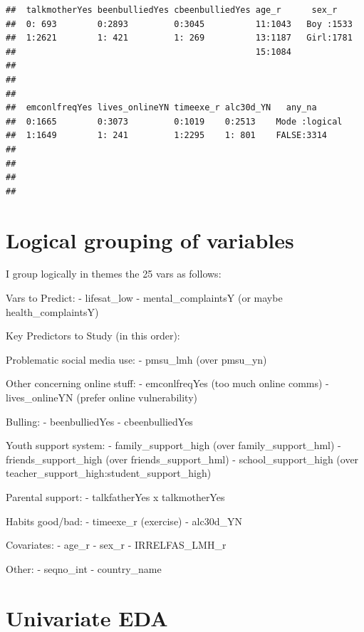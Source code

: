 \documentclass[
]{article}
\begin{document}
\begin{verbatim}
##  talkmotherYes beenbulliedYes cbeenbulliedYes age_r      sex_r     
##  0: 693        0:2893         0:3045          11:1043   Boy :1533  
##  1:2621        1: 421         1: 269          13:1187   Girl:1781  
##                                               15:1084              
##                                                                    
##                                                                    
##                                                                    
##  emconlfreqYes lives_onlineYN timeexe_r alc30d_YN   any_na       
##  0:1665        0:3073         0:1019    0:2513    Mode :logical  
##  1:1649        1: 241         1:2295    1: 801    FALSE:3314     
##                                                                  
##                                                                  
##                                                                  
## 
\end{verbatim}

\section{Logical grouping of
variables}\label{logical-grouping-of-variables}

I group logically in themes the 25 vars as follows:

Vars to Predict: - lifesat\_low - mental\_complaintsY (or maybe
health\_complaintsY)

Key Predictors to Study (in this order):

Problematic social media use: - pmsu\_lmh (over pmsu\_yn)

Other concerning online stuff: - emconlfreqYes (too much online comms) -
lives\_onlineYN (prefer online vulnerability)

Bulling: - beenbulliedYes - cbeenbulliedYes

Youth support system: - family\_support\_high (over
family\_support\_hml) - friends\_support\_high (over
friends\_support\_hml) - school\_support\_high (over
teacher\_support\_high:student\_support\_high)

Parental support: - talkfatherYes x talkmotherYes

Habits good/bad: - timeexe\_r (exercise) - alc30d\_YN

Covariates: - age\_r - sex\_r - IRRELFAS\_LMH\_r

Other: - seqno\_int - country\_name

\section{Univariate EDA}\label{univariate-eda}
\end{document}
